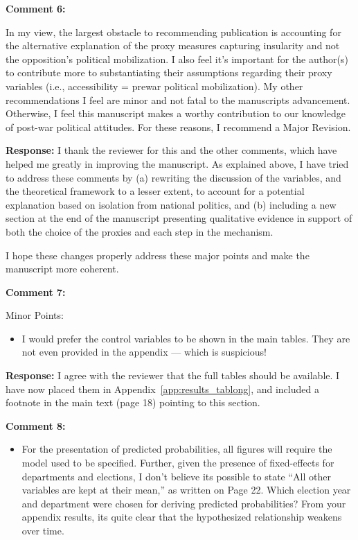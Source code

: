 \documentclass[12pt, a4paper, notitlepage]{article}
\begin{document}
\vspace{15pt}
\noindent\textbf{Comment 6:}
\begin{displayquote}
In my view, the largest obstacle to recommending publication is accounting for the alternative explanation of the proxy measures capturing insularity and not the opposition’s political mobilization. I also feel it’s important for the author(s) to contribute more to substantiating their assumptions regarding their proxy variables (i.e., accessibility = prewar political mobilization). My other recommendations I feel are minor and not fatal to the manuscripts advancement. Otherwise, I feel this manuscript makes a worthy contribution to our knowledge of post-war political attitudes. For these reasons, I recommend a Major Revision.
\end{displayquote}

\noindent\textbf{Response:} I thank the reviewer for this and the other comments, which have helped me greatly in improving the manuscript. As explained above, I have tried to address these comments by (a) rewriting the discussion of the variables, and the theoretical framework to a lesser extent, to account for a potential explanation based on isolation from national politics, and (b) including a new section at the end of the manuscript presenting qualitative evidence in support of both the choice of the proxies and each step in the mechanism.

I hope these changes properly address these major points and make the manuscript more coherent.

\vspace{15pt}
\noindent\textbf{Comment 7:}
\begin{displayquote}
Minor Points:
\begin{itemize}
\item I would prefer the control variables to be shown in the main tables. They are not even provided in the appendix — which is suspicious!
\end{itemize}
\end{displayquote}

\noindent\textbf{Response:} I agree with the reviewer that the full tables should be available. I have now placed them in Appendix~\ref{app:results_tablong}, and included a footnote in the main text (page 18) pointing to this section.

\vspace{15pt}
\noindent\textbf{Comment 8:}
\begin{displayquote}
\begin{itemize}
\item For the presentation of predicted probabilities, all figures will require the model used to be specified. Further, given the presence of fixed-effects for departments and elections, I don’t believe its possible to state “All other variables are kept at their mean,” as written on Page 22. Which election year and department were chosen for deriving predicted probabilities? From your appendix results, its quite clear that the hypothesized relationship weakens over time.
\end{itemize}
\end{displayquote}
\end{document}
